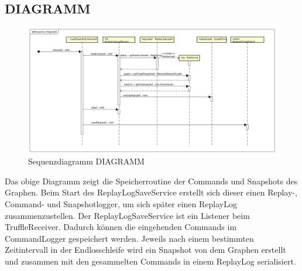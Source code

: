 \subsection{DIAGRAMM}
\begin{figure}
  \centering
  \includegraphics[width=\textwidth]{../diagramimages/sd_loadsnapshot.png}
  \caption[Sequenzdiagramm DIAGRAMM]{Sequenzdiagramm DIAGRAMM}
\end{figure}
\FloatBarrier

 Das obige Diagramm zeigt die Speicherroutine der Commands und Snapshots des Graphen. Beim Start des ReplayLogSaveService erstellt sich dieser einen Replay-, Command- und Snapshotlogger, um sich später einen ReplayLog zusammenzustellen. Der ReplayLogSaveService ist ein Listener beim TruffleReceiver. Dadurch können die eingehenden Commands im CommandLogger gespeichert werden. Jeweils nach einem bestimmten Zeitintervall in der Endlosschleife wird ein Snapshot von dem Graphen erstellt und zusammen mit den gesammelten Commands in einem ReplayLog serialisiert. 